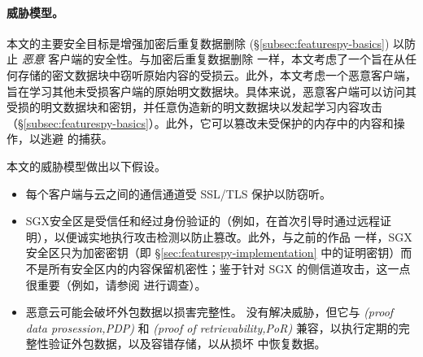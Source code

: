 \paragraph*{威胁模型。} 本文的主要安全目标是增强加密后重复数据删除 (\S\ref{subsec:featurespy-basics}) 以防止 {\em 恶意} 客户端的安全性。与加密后重复数据删除 \cite{bellare2013MLE} 一样，本文考虑了一个旨在从任何存储的密文数据块中窃听原始内容的受损云。此外，本文考虑一个恶意客户端，旨在学习其他未受损客户端的原始明文数据块。具体来说，恶意客户端可以访问其受损的明文数据块和密钥，并任意伪造新的明文数据块以发起学习内容攻击（\S\ref{subsec:featurespy-basics}）。此外，它可以篡改未受保护的内存中的内容和操作，以逃避 \sysnameF 的捕获。

本文的威胁模型做出以下假设。
\begin{itemize}[leftmargin=*]
    \item
          每个客户端与云之间的通信通道受 SSL/TLS 保护以防窃听。
    \item
          SGX安全区是受信任和经过身份验证的（例如，在首次引导时通过远程证明），以便诚实地执行攻击检测以防止篡改。此外，与之前的作品 \cite{shinde20, ren21} 一样，SGX安全区只为加密密钥（即 \S\ref{sec:featurespy-implementation} 中的证明密钥）而不是所有安全区内的内容保留机密性；鉴于针对 SGX 的侧信道攻击，这一点很重要（例如，请参阅 \cite{fei21} 进行调查）。
    \item
          恶意云可能会破坏外包数据以损害完整性。 \sysnameF 没有解决威胁，但它与 \textit{  (proof data prosession,PDP)} \cite{ateniese2007provable} 和 \textit{  (proof of retrievability,PoR)} \cite{juels2007pors} 兼容，以执行定期的完整性验证外包数据，以及容错存储，以从损坏 \cite{li15} 中恢复数据。
\end{itemize}